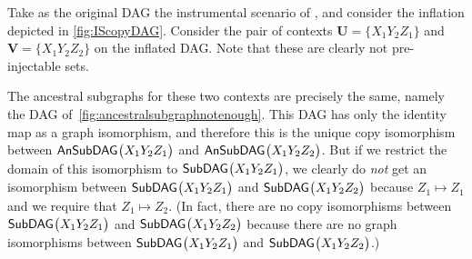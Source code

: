 Take as the original DAG the instrumental scenario of \citet{pearl1995instrumental}, and consider the inflation depicted in \cref{fig:IScopyDAG}.  Consider the pair of contexts $\bm{U} = \{ X_1 Y_2 Z_1\}$ and $\bm{V}= \{ X_1 Y_2 Z_2\}$ on the inflated DAG.  Note that these are clearly not pre-injectable sets. 

The ancestral subgraphs for these two contexts are precisely the same, namely the DAG of~\cref{fig:ancestralsubgraphnotenough}.  This DAG has only the identity map as a graph isomorphism, and therefore this is the unique copy isomorphism between ${\operatorname{\mathsf{AnSubDAG}}_{}}\bigl\lparen X_1 Y_2 Z_1\bigr\rparen$ and ${\operatorname{\mathsf{AnSubDAG}}_{}}\bigl\lparen X_1 Y_2 Z_2\bigr\rparen$.  But if we restrict the domain of this isomorphism to ${\operatorname{\mathsf{SubDAG}}_{}}\bigl\lparen X_1 Y_2 Z_1\bigr\rparen$, we clearly do {\em not} get an isomorphism between ${\operatorname{\mathsf{SubDAG}}_{}}\bigl\lparen X_1 Y_2 Z_1\bigr\rparen$ and ${\operatorname{\mathsf{SubDAG}}_{}}\bigl\lparen X_1 Y_2 Z_2\bigr\rparen$ because $Z_1 \mapsto Z_1$ and we require that $Z_1 \mapsto Z_2$.  (In fact, there are no copy isomorphisms between ${\operatorname{\mathsf{SubDAG}}_{}}\bigl\lparen X_1 Y_2 Z_1\bigr\rparen$ and ${\operatorname{\mathsf{SubDAG}}_{}}\bigl\lparen X_1 Y_2 Z_2\bigr\rparen$ because there are no graph isomorphisms between ${\operatorname{\mathsf{SubDAG}}_{}}\bigl\lparen X_1 Y_2 Z_1\bigr\rparen$ and ${\operatorname{\mathsf{SubDAG}}_{}}\bigl\lparen X_1 Y_2 Z_2\bigr\rparen$.)  %



